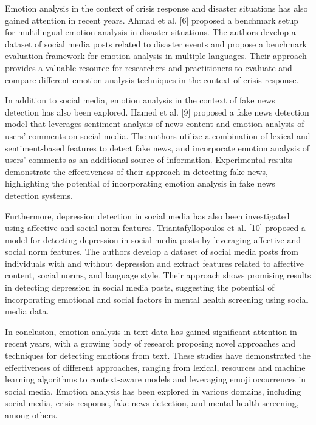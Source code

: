 \documentclass[conference]{IEEEtran}
\begin{document}
Emotion analysis in the context of crisis response and disaster situations has also gained attention in recent years. Ahmad et al. [6] proposed a benchmark setup for multilingual emotion analysis in disaster situations. The authors develop a dataset of social media posts related to disaster events and propose a benchmark evaluation framework for emotion analysis in multiple languages. Their approach provides a valuable resource for researchers and practitioners to evaluate and compare different emotion analysis techniques in the context of crisis response.

In addition to social media, emotion analysis in the context of fake news detection has also been explored. Hamed et al. [9] proposed a fake news detection model that leverages sentiment analysis of news content and emotion analysis of users' comments on social media. The authors utilize a combination of lexical and sentiment-based features to detect fake news, and incorporate emotion analysis of users' comments as an additional source of information. Experimental results demonstrate the effectiveness of their approach in detecting fake news, highlighting the potential of incorporating emotion analysis in fake news detection systems.

Furthermore, depression detection in social media has also been investigated using affective and social norm features. Triantafyllopoulos et al. [10] proposed a model for detecting depression in social media posts by leveraging affective and social norm features. The authors develop a dataset of social media posts from individuals with and without depression and extract features related to affective content, social norms, and language style. Their approach shows promising results in detecting depression in social media posts, suggesting the potential of incorporating emotional and social factors in mental health screening using social media data.

In conclusion, emotion analysis in text data has gained significant attention in recent years, with a growing body of research proposing novel approaches and techniques for detecting emotions from text. These studies have demonstrated the effectiveness of different approaches, ranging from lexical, resources and machine learning algorithms to context-aware models and leveraging emoji occurrences in social media. Emotion analysis has been explored in various domains, including social media, crisis response, fake news detection, and mental health screening, among others.
\end{document}
